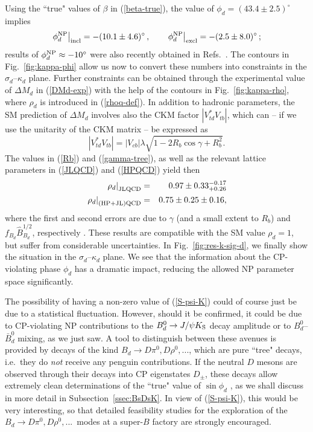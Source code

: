 \documentclass[11pt]{cernrep}
\begin{document}
Using the ``true" values of $\beta$ in (\ref{beta-true}), the value of
$\phi_d=(43.4\pm2.5)^\circ$ implies
\begin{equation}\label{phiNPd-num}
\left.\phi^{\rm NP}_d\right|_{\rm incl} = -(10.1\pm 4.6)^\circ\,,\qquad
\left.\phi^{\rm NP}_d\right|_{\rm excl} = -(2.5\pm 8.0)^\circ\,;
\end{equation}
results of $\phi_d^{\rm NP}\approx-10^\circ$ were also recently obtained in 
Refs.~\cite{BFRS-5,UTfit-NP}. The contours in Fig.~\ref{fig:kappa-phi} allow us now
to convert these numbers into constraints in the $\sigma_d$--$\kappa_d$ 
plane. Further constraints can be obtained through the experimental value of 
$\Delta M_d$ in (\ref{DMd-exp}) with the help of the contours in
Fig.~\ref{fig:kappa-rho}, where $\rho_d$ is introduced in (\ref{rhoq-def}).
In addition to  hadronic parameters, the SM prediction of $\Delta M_d$ involves 
also the CKM factor $|V_{td}^\ast V_{tb}|$, which can -- if we use the unitarity of the 
CKM matrix -- be expressed as
\begin{equation}\label{CKM-Bd}
|V_{td}^\ast V_{tb}|=|V_{cb}|\lambda\sqrt{1-2R_b\cos\gamma+R_b^2}.
\end{equation}
The values in (\ref{Rb}) and (\ref{gamma-tree}), as well as the relevant 
lattice parameters in (\ref{JLQCD}) and (\ref{HPQCD}) yield then
\begin{eqnarray}
\left.\rho_d\right|_{\rm JLQCD} &=&
  0.97\pm0.33^{-0.17}_{+0.26}\label{rhod-JLQCD}\\
\left.\rho_d\right|_{\rm  (HP+JL)QCD} &=& 
0.75\pm0.25\pm0.16,\label{rhod-HPJL}
\end{eqnarray}
where the first and second errors are due to $\gamma$ (and a small extent to
$R_b$) and $f_{B_d} \hat B_{B_d}^{1/2}$, respectively \cite{BF-DMs}. 
These results are compatible with the SM value $\rho_d=1$, but suffer from 
considerable uncertainties. In Fig.~\ref{fig:res-k-sig-d}, we finally show the
situation in the $\sigma_d$--$\kappa_d$ plane. We see that the information
about the CP-violating phase $\phi_d$ has a dramatic impact, reducing
the allowed NP parameter space significantly. 

The possibility of having a non-zero value of (\ref{S-psi-K}) could of course just 
be due to a statistical fluctuation. However, should it be confirmed, 
it could be due to CP-violating NP contributions to the $B^0_d\to J/\psi K_{\rm S}$ 
decay amplitude or to $B^0_d$--$\bar B^0_d$ mixing, as we just saw.
A tool to distinguish between these avenues is provided by decays 
of the kind $B_d\to D\pi^0, D\rho^0, ...$, which are pure ``tree" decays, i.e.\
they do {\it not} receive any penguin contributions. If the neutral $D$ mesons
are observed through their decays into CP eigenstates $D_\pm$, these decays
allow extremely clean determinations of the ``true" value of $\sin\phi_d$ 
\cite{RF-BdDpi0}, as we shall discuss in more detail in Subsection~\ref{ssec:BsDsK}. 
In view of (\ref{S-psi-K}), this would be very interesting, so that detailed 
feasibility studies for the exploration of the $B_d\to D\pi^0, D\rho^0, ...$\ modes 
at a super-$B$ factory are strongly encouraged. 
\end{document}
